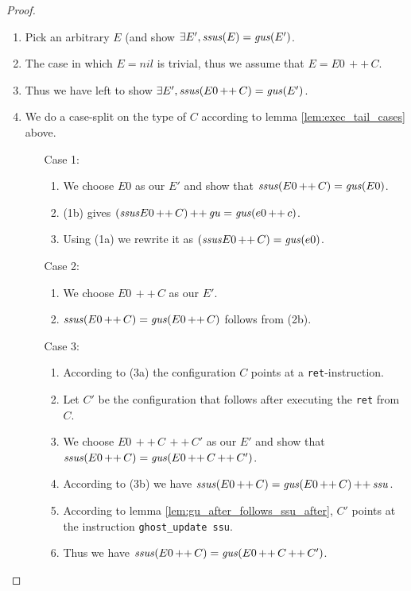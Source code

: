 \documentclass[a4paper,11pt]{article}
\newcommand{\app}{\mathit{\,++\,}}
\begin{document}
\begin{proof}
  \begin{enumerate}
  \item Pick an arbitrary $E$ (and show $\exists E', \mathit{ssus}(E) = \mathit{gus}(E')$.
  \item The case in which $E = \mathit{nil}$ is trivial, thus we assume that $E = E0 \app C$.
  \item Thus we have left to show $\exists E', \ssus(E0 \app C) = \gus(E')$.
  \item We do a case-split on the type of $C$ according to lemma \ref{lem:exec_tail_cases} above.
    
    \begin{enumerate}
    \item[Case 1:]
      \begin{enumerate}
      \item We choose $E0$ as our $E'$ and show that $\ssus(E0 \app C) = \gus(E0)$.
      \item (1b) gives $(\ssus E0 \app C) \app \mathit{gu} = \gus(e0 \app c)$.
      \item Using (1a) we rewrite it as $(\ssus E0 \app C) = \gus(e0)$.
      \end{enumerate}
    \item[Case 2:]
      \begin{enumerate}
      \item We choose $E0 \app C$ as our $E'$.
      \item $\ssus(E0 \app C) = \gus(E0 \app C)$ follows from (2b).
      \end{enumerate}
    \item[Case 3:]
      \begin{enumerate}
      \item According to (3a) the configuration $C$ points at a {\tt ret}-instruction.
      \item Let $C'$ be the configuration that follows after executing the {\tt ret} from $C$.
      \item We choose $E0 \app C \app C'$ as our $E'$ and show that $\ssus(E0 \app C) = \gus (E0 \app C \app C')$.
      \item According to (3b) we have $\ssus(E0 \app C) = \gus(E0 \app C) \app \mathit{ssu}$.
      \item According to lemma \ref{lem:gu_after_follows_ssu_after}, $C'$ points at the instruction {\tt ghost\_update ssu}.
      \item Thus we have $\ssus(E0 \app C) = \gus(E0 \app C \app C')$.
      \end{enumerate}

\end{enumerate}
\end{enumerate}
\end{proof}
\end{document}
